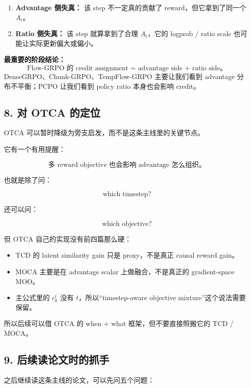 \begin{enumerate}[leftmargin=1.5em]
  \item \textbf{Advantage 侧失真：} 该 step 不一定真的贡献了 reward，但它拿到了同一个 \(A_i\)。
  \item \textbf{Ratio 侧失真：} 该 step 就算拿到了合理 \(A_t\)，它的 logprob / ratio scale 也可能让实际更新偏大或偏小。
\end{enumerate}

\begin{summarybox}
\textbf{最重要的阶段结论：}
\[
\boxed{
\text{Flow-GRPO 的 credit assignment = advantage side + ratio side。}
}
\]
DenseGRPO、Chunk-GRPO、TempFlow-GRPO 主要让我们看到 advantage 分布不平衡；PCPO 让我们看到 policy ratio 本身也会影响 credit。
\end{summarybox}

\subsection{8. 对 OTCA 的定位}

OTCA 可以暂时降级为旁支启发，而不是这条主线里的关键节点。

它有一个有用提醒：

\[
\text{多 reward objective 也会影响 advantage 怎么组织。}
\]

也就是除了问：

\[
\text{which timestep?}
\]

还可以问：

\[
\text{which objective?}
\]

但 OTCA 自己的实现没有前四篇那么硬：

\begin{itemize}[leftmargin=1.5em]
  \item TCD 的 latent similarity gain 只是 proxy，不是真正 causal reward gain。
  \item MOCA 主要是在 advantage scalar 上做融合，不是真正的 gradient-space MOO。
  \item 主公式里的 \(c_k^i\) 没有 \(t\)，所以“timestep-aware objective mixture”这个说法需要保留。
\end{itemize}

所以后续可以借 OTCA 的 when + what 框架，但不要直接照搬它的 TCD / MOCA。

\subsection{9. 后续读论文时的抓手}

之后继续读这条主线的论文，可以先问五个问题：

